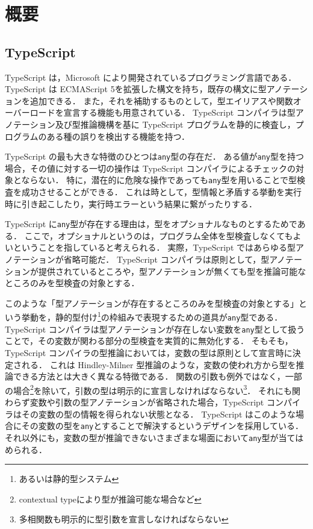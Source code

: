 \chapter{概要}

\section{TypeScript}

TypeScript は，Microsoft により開発されているプログラミング言語である．
TypeScript は ECMAScript 5\cite{ES5}を拡張した構文を持ち，既存の構文に型アノテーションを追加できる．
また，それを補助するものとして，型エイリアスや関数オーバーロードを宣言する機能も用意されている．
TypeScript コンパイラは型アノテーション及び型推論機構を基に TypeScript プログラムを静的に検査し，プログラムのある種の誤りを検出する機能を持つ．

TypeScript の最も大きな特徴のひとつは\texttt{any}型の存在だ．
ある値が\texttt{any}型を持つ場合，その値に対する一切の操作は TypeScript コンパイラによるチェックの対象とならない．
特に，潜在的に危険な操作であっても\texttt{any}型を用いることで型検査を成功させることができる．
これは時として，型情報と矛盾する挙動を実行時に引き起こしたり，実行時エラーという結果に繋がったりする．

TypeScript に\texttt{any}型が存在する理由は，型をオプショナルなものとするためである．
ここで，オプショナルというのは，プログラム全体を型検査しなくてもよいということを指していると考えられる．
実際，TypeScript ではあらゆる型アノテーションが省略可能だ．
TypeScript コンパイラは原則として，型アノテーションが提供されているところや，型アノテーションが無くても型を推論可能なところのみを型検査の対象とする．

このような「型アノテーションが存在するところのみを型検査の対象とする」という挙動を，静的型付け\footnote{あるいは静的型システム}の枠組みで表現するための道具が\texttt{any}型である．
TypeScript コンパイラは型アノテーションが存在しない変数を\texttt{any}型として扱うことで，その変数が関わる部分の型検査を実質的に無効化する．
そもそも，TypeScript コンパイラの型推論においては，変数の型は原則として宣言時に決定される．
これは Hindley-Milner 型推論\cite{MILNER1978348}のような，変数の使われ方から型を推論できる方法とは大きく異なる特徴である．
関数の引数も例外ではなく，一部の場合\footnote{contextual typeにより型が推論可能な場合など}を除いて，引数の型は明示的に宣言しなければならない\footnote{多相関数も明示的に型引数を宣言しなければならない}．
それにも関わらず変数や引数の型アノテーションが省略された場合，TypeScript コンパイラはその変数の型の情報を得られない状態となる．
TypeScript はこのような場合にその変数の型を\texttt{any}とすることで解決するというデザインを採用している．
それ以外にも，変数の型が推論できないさまざまな場面において\texttt{any}型が当てはめられる．

